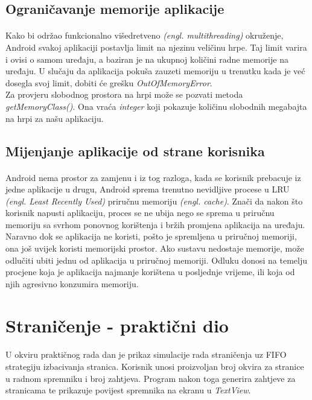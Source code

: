 \documentclass[times, utf8, zavrsni]{fer}
\begin{document}
\subsection{Ograničavanje memorije aplikacije}
\paragraph{}
Kako bi održao funkcionalno višedretveno \textit{(engl. multithreading)} okruženje, Android svakoj aplikaciji postavlja limit na njezinu veličinu hrpe. Taj limit varira i ovisi o samom uređaju, a baziran je na ukupnoj količini radne memorije na uređaju. U slučaju da aplikacija pokuša zauzeti memoriju u trenutku kada je već dosegla svoj limit, dobiti će grešku \textit{OutOfMemoryError}.\\

Za provjeru slobodnog prostora na hrpi može se pozvati metoda \textit{getMemoryClass()}. Ona vraća \textit{integer} koji pokazuje količinu slobodnih megabajta na hrpi za našu aplikaciju.

\subsection{Mijenjanje aplikacije od strane korisnika}
\paragraph{}
Android nema prostor za zamjenu i iz tog razloga, kada se korisnik prebacuje iz jedne aplikacije u drugu, Android sprema trenutno nevidljive procese u LRU \textit{(engl. Least Recently Used)} priručnu memoriju \textit{(engl. cache)}. Znači da nakon što korisnik napusti aplikaciju, proces se ne ubija nego se sprema u priručnu memoriju sa svrhom ponovnog korištenja i bržih promjena aplikacija na uređaju.\\

Naravno dok se aplikacija ne koristi, pošto je spremljena u priručnoj memoriji, ona još uvijek koristi memorijski prostor. Ako sustavu nedostaje memorije, može odlučiti ubiti jednu od aplikacija u priručnoj memoriji. Odluku donosi na temelju procjene koja je aplikacija najmanje korištena u posljednje vrijeme, ili  koja od njih agresivno konzumira memoriju.

\section{Straničenje - praktični dio}
\paragraph{}
U okviru praktičnog rada dan je prikaz simulacije rada straničenja uz FIFO strategiju izbacivanja stranica. Korisnik unosi proizvoljan broj okvira za stranice u radnom spremniku i broj zahtjeva. Program nakon toga generira zahtjeve za stranicama te prikazuje povijest spremnika na ekranu u \textit{TextView}.\newpage
\end{document}
